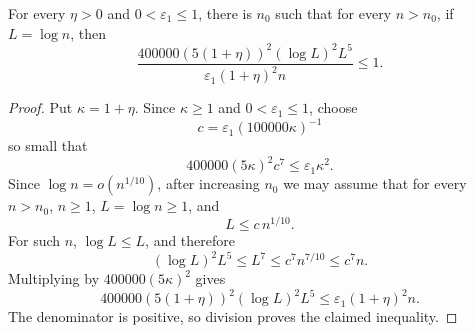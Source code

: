 \begin{helper}
For every \(\eta>0\) and \(0<\varepsilon_1\le1\), there is \(n_0\) such that
for every \(n>n_0\), if \(L=\log n\), then
\[
\frac{400000(5(1+\eta))^2(\log L)^2L^5}
{\varepsilon_1(1+\eta)^2n}\le1.
\]
\end{helper}
\begin{proof}
Put \(\kappa=1+\eta\).  Since \(\kappa\ge1\) and
\(0<\varepsilon_1\le1\), choose
\[
c=\varepsilon_1(100000\kappa)^{-1}
\]
so small that
\[
400000(5\kappa)^2c^7\le\varepsilon_1\kappa^2.
\]
Since \(\log n=o(n^{1/10})\), after increasing \(n_0\) we may assume that
for every \(n>n_0\), \(n\ge1\), \(L=\log n\ge1\), and
\[
L\le c\,n^{1/10}.
\]
For such \(n\), \(\log L\le L\), and therefore
\[
(\log L)^2L^5\le L^7\le c^7n^{7/10}\le c^7n.
\]
Multiplying by \(400000(5\kappa)^2\) gives
\[
400000(5(1+\eta))^2(\log L)^2L^5
\le \varepsilon_1(1+\eta)^2n.
\]
The denominator is positive, so division proves the claimed inequality.
\end{proof}
